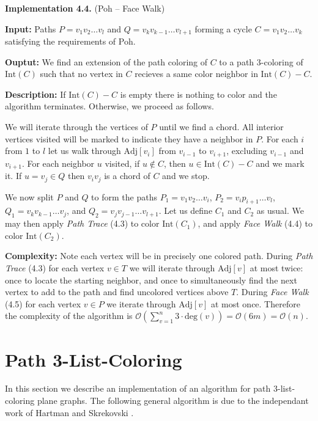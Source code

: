 \documentclass[letterpaper, 12pt]{amsart}
\theoremstyle{definition}
\theoremstyle{definition}
\theoremstyle{thm}
\theoremstyle{definition}
\begin{document}
\noindent\textbf{Implementation 4.4.} (Poh -- Face Walk)

\noindent\textbf{Input:} Paths $P=v_1v_2\ldots v_l$ and
$Q=v_kv_{k-1}\ldots v_{l+1}$ forming a cycle $C=v_1v_2\ldots v_k$ satisfying
the requirements of Poh.

\noindent\textbf{Ouptut:} We find an extension of the path coloring of $C$ to
a path $3$-coloring of $\text{Int}(C)$ such that
no vertex in $C$ recieves a same color neighbor in $\text{Int}(C)-C$.

\noindent\textbf{Description:} If $\text{Int}(C)-C$ is empty there is nothing to
color and the algorithm terminates. Otherwise, we proceed as follows.

We will iterate through the vertices of $P$ until we find a chord. All interior
vertices visited will be marked to indicate they have a neighbor in $P$. For
each $i$ from $1$ to $l$ let us walk through
$\text{Adj}[v_i]$ from $v_{i-1}$ to $v_{i+1}$, excluding
$v_{i-1}$ and $v_{i+1}$. For each neighbor $u$ visited,
if $u\not\in C$, then $u\in \text{Int}(C)-C$ and we
mark it. If $u=v_j\in Q$ then $v_iv_j$ is a chord of $C$ and we stop.

We now split $P$ and $Q$ to form the paths
$P_1=v_1v_2\ldots v_i$, $P_2=v_ip_{i+1}\ldots v_l$, $Q_1=v_kv_{k-1}\ldots v_j$,
and $Q_2=v_jv_{j-1}\ldots v_{l+1}$. Let us define $C_1$ and $C_2$ as usual.
We may then apply \textit{Path Trace} (4.3) to color $\text{Int}(C_1)$, and
apply \textit{Face Walk} (4.4) to color $\text{Int}(C_2)$.

\noindent\textbf{Complexity:} Note each vertex will be in precisely one colored
path. During \textit{Path Trace} (4.3) for each vertex $v\in T$ we will iterate through
$\text{Adj}[v]$ at most twice: once to locate the starting neighbor, and once
to simultaneously find the next vertex to add to the path and find uncolored
vertices above $T$. During \textit{Face Walk} (4.5) for each vertex
$v\in P$ we iterate through $\text{Adj}[v]$ at most once. Therefore the complexity of the algorithm is
$\mathcal{O}\left(\sum_{v=1}^n3\cdot\text{deg}(v)\right)=\mathcal{O}(6m)=\mathcal{O}(n)$.



\section{Path 3-List-Coloring}

In this section we describe an implementation of an algorithm for path
$3$-list-coloring plane graphs. The following general algorithm is due to the
independant work of Hartman \cite{hartman} and Skrekovski \cite{skrekovski}.\\
\end{document}
